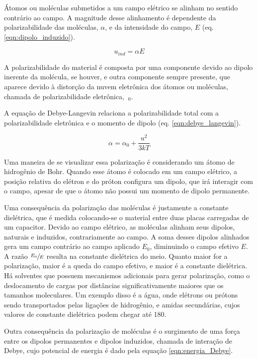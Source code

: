 	Átomos ou moléculas submetidos a um campo elétrico se alinham no sentido contrário ao campo. A magnitude desse alinhamento é dependente da polarizabilidade das moléculas, \(\alpha\), e da intensidade do campo, \(E\)  (eq. \ref{eqn:dipolo_induzido}).
	
	\begin{equation}
		u_{ind} = \alpha E
		\label{eqn:dipolo_induzido}
	\end{equation}
	
	A polarizabilidade do material é composta por uma componente devido ao dipolo inerente da molécula, se houver, e outra componente sempre presente, que aparece devido à distorção da nuvem eletrônica dos átomos ou moléculas, chamada de polarizabilidade eletrônica, \(\
	_0\).
	
	A equação de Debye-Langevin relaciona a polarizabilidade total com a polarizabilidade eletrônica e o momento de dipolo (eq. \ref{eqn:debye_langevin}).
	
	\begin{equation}
		\alpha = \alpha _ { 0 } + \dfrac{u ^ { 2 }}{ 3 k T }
		\label{eqn:debye_langevin}
	\end{equation}
	
	Uma maneira de se visualizar essa polarização é considerando um átomo de hidrogênio de Bohr. Quando esse átomo é colocado em um campo elétrico, a posição relativa do elétron e do próton configura um dipolo, que irá interagir com o campo, apesar de que o átomo não possui um momento de dipolo permanente.
	
	Uma consequência da polarização das moléculas é justamente a constante dielétrica, que é medida colocando-se o material entre duas placas carregadas de um capacitor. Devido ao campo elétrico, as moléculas alinham seus dipolos, naturais e induzidos, contrariamente ao campo. A soma desses dipolos alinhados gera um campo contrário ao campo aplicado \(E_0\), diminuindo o campo efetivo \(E\). A razão \(\sfrac{E_0}{E}\) resulta na constante dielétrica do meio. Quanto maior for a polarização, maior é a queda do campo efetivo, e maior é a constante dielétrica. Há solventes que possuem mecanismos adicionais para gerar polarização, como o deslocamento de cargas por distâncias significativamente maiores que os tamanhos moleculares. Um exemplo disso é a água, onde elétrons ou prótons sendo transportados pelas ligações de hidrogênio, e amidas secundárias, cujos valores de constante dielétrica podem chegar até 180.

	Outra consequência da polarização de moléculas é o surgimento de uma força entre os dipolos permanentes e dipolos induzidos, chamada de interação de Debye, cujo potencial de energia é dado pela equação \ref{eqn:energia_Debye}.
	
